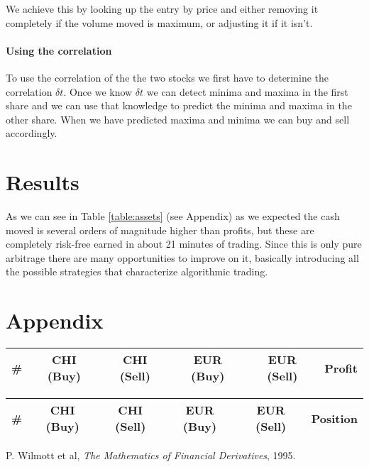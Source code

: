 \documentclass[8 pt]{article}
\begin{document}
\begin{multicols*}{2}
  We achieve this by looking up the entry by price and either removing it completely if the volume moved is maximum, or adjusting it if it isn't.

\paragraph{Using the correlation}

To use the correlation of the the two stocks we first have to determine the correlation $\delta t$. Once we know $\delta t$ we can detect minima and maxima in the first share and we can use that knowledge to predict the minima and maxima in the other share.
When we have predicted maxima and minima we can buy and sell accordingly.


  \section{Results}

  As we can see in Table \ref{table:assets} (see Appendix) as we expected the cash moved is several orders of magnitude higher than profits, but these are completely risk-free earned in about 21 minutes of trading. Since this is only pure arbitrage there are many opportunities to improve on it, basically introducing all the possible strategies that characterize algorithmic trading.

\section{Appendix}

\begin{minipage}{\textwidth}
\begin{center}
  \Large
  \label{table:cash}
  \begin{tabular}{|c|c|c|c|c|c|}
    \hline
    \# & CHI (Buy) & CHI (Sell) & EUR (Buy) & EUR (Sell) & Profit \\ \hline
    
  \end{tabular}
\end{center}

\vspace{1.0cm}

\begin{center}
  \Large
  \label{table:assets}
  \begin{tabular}{|c|c|c|c|c|c|}
    \hline
    \# & CHI (Buy) & CHI (Sell) & EUR (Buy) & EUR (Sell) & Position \\ \hline
    
  \end{tabular}
\end{center}
\end{minipage}

\begin{thebibliography}{28}
\raggedright
{}

 P. Wilmott et al, \emph{The Mathematics of Financial Derivatives}, 1995.

\end{thebibliography}

\end{multicols*}
\end{document}
